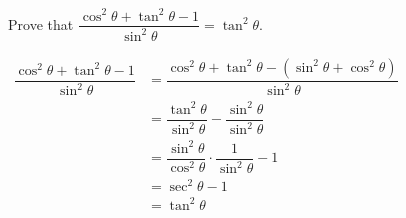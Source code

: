 \documentclass{report}
\begin{document}
\begin{question}
	Prove that $\dfrac{\cos ^2 \theta+\tan ^2 \theta-1}{\sin ^2 \theta}=\tan ^2 \theta$.
	
	\proof{}
	
	\noindent $\begin{aligned} \dfrac{\cos ^2 \theta+\tan ^2 \theta-1}{\sin ^2 \theta} & =\dfrac{\cos ^2 \theta+\tan ^2 \theta-\left(\sin ^2 \theta+\cos ^2 \theta\right)}{\sin ^2 \theta} \\ & =\dfrac{\tan ^2 \theta}{\sin ^2 \theta}-\dfrac{\sin ^2 \theta}{\sin ^2 \theta} \\ & =\dfrac{\sin ^2 \theta}{\cos ^2 \theta} \cdot \dfrac{1}{\sin ^2 \theta}-1 \\ & =\sec ^2 \theta-1 \\ & =\tan ^2 \theta\end{aligned}$
\end{question}
\end{document}
